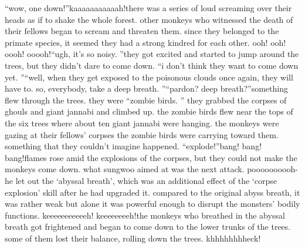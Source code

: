“wow, one down!”kaaaaaaaaaaah!there was a series of loud screaming over their heads as if to shake the whole forest.
other monkeys who witnessed the death of their fellows began to scream and threaten them.
since they belonged to the primate species, it seemed they had a strong kindred for each other.
ooh! ooh! oooh! ooooh!“ugh, it’s so noisy.
”they got excited and started to jump around the trees, but they didn’t dare to come down.
“i don’t think they want to come down yet.
”“well, when they get exposed to the poisonous clouds once again, they will have to.
 so, everybody, take a deep breath.
”“pardon? deep breath?”something flew through the trees.
 they were “zombie birds.
” they grabbed the corpses of ghouls and giant jannabi and climbed up.
the zombie birds flew near the tops of the six trees where about ten giant jannabi were hanging.
 the monkeys were gazing at their fellows’ corpses the zombie birds were carrying toward them.
something that they couldn’t imagine happened.
“explode!”bang! bang! bang!flames rose amid the explosions of the corpses, but they could not make the monkeys come down.
what sungwoo aimed at was the next attack.
poooooooooh-he let out the ‘abyssal breath’, which was an additional effect of the ‘corpse explosion’ skill after he had upgraded it.
compared to the original abyss breath, it was rather weak but alone it was powerful enough to disrupt the monsters’ bodily functions.
keeeeeeeeeeeh! keeeeeeeeh!the monkeys who breathed in the abyssal breath got frightened and began to come down to the lower trunks of the trees.
 some of them lost their balance, rolling down the trees.
khhhhhhhheck!

